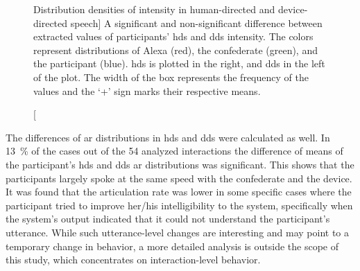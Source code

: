 \begin{figure}[t]
	\centering
	\hfill %
	\caption
	[Distribution densities of intensity in human-directed and device-directed speech]
	{A significant  and non-significant  difference between extracted values of participants' \ac{hds} and \ac{dds} intensity.
		The colors represent distributions of Alexa (red), the confederate (green), and the participant (blue).
		\ac{hds} is plotted in the right, and \ac{dds} in the left of the plot.
		The width of the box represents the frequency of the values and the \enquote*{+} sign marks their respective means.}
	\label{fig:hds_dds_violin_intensity_comparison}
\end{figure}

The differences of \acf{ar} distributions in \ac{hds} and \ac{dds} were calculated as well.
In \SI{13}{\percent} of the cases out of the 54 analyzed interactions the difference of means of the participant's \ac{hds} and \ac{dds} \ac{ar} distributions was significant.
This shows that the participants largely spoke at the same speed with the confederate and the device.
It was found that the articulation rate was lower in some specific cases where the participant tried to improve her/his intelligibility to the system, specifically when the system's output indicated that it could not understand the participant's utterance.
While such utterance-level changes are interesting and may point to a temporary change in behavior, a more detailed analysis is outside the scope of this study, which concentrates on interaction-level behavior.

